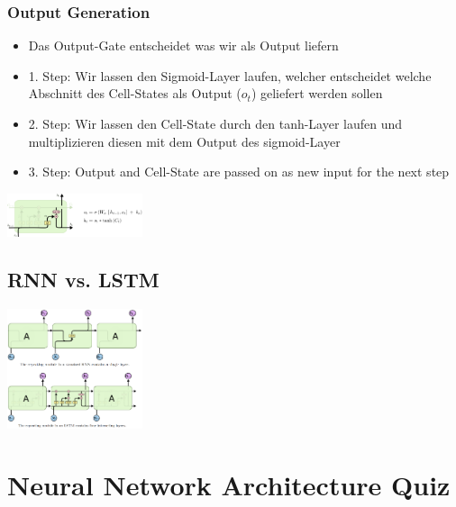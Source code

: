 \documentclass{article}
\newenvironment{Figure}
	{\par\medskip\noindent\minipage{\linewidth}}
	{\endminipage\par\medskip}
\theoremstyle{merke}
\theoremstyle{definition}
\begin{document}
            \subsubsection{Output Generation}
            \begin{itemize}
                \item Das Output-Gate entscheidet was wir als Output liefern
                \item 1. Step: Wir lassen den Sigmoid-Layer laufen, welcher entscheidet welche Abschnitt des Cell-States als Output ($o_t$) geliefert werden sollen
                \item 2. Step: Wir lassen den Cell-State durch den tanh-Layer laufen und multiplizieren diesen mit dem Output des sigmoid-Layer
                \item 3. Step: Output and Cell-State are passed on as new input for the next step 
            \end{itemize}
            \begin{Figure}
            \centering
            \includegraphics[width=150px]{img/LSTMOutputGeneration.png}
                \label{fig:Abbildung der Output Generatino in LSTM}
            \end{Figure}
        \subsection{RNN vs. LSTM}
        \begin{Figure}
        \centering
        \includegraphics[width=150px]{img/RNNvsLSTM.png}
            \label{fig:Abbildung der Struktur eines LSTM}
        \end{Figure}


    \section{Neural Network Architecture Quiz}
\end{document}

